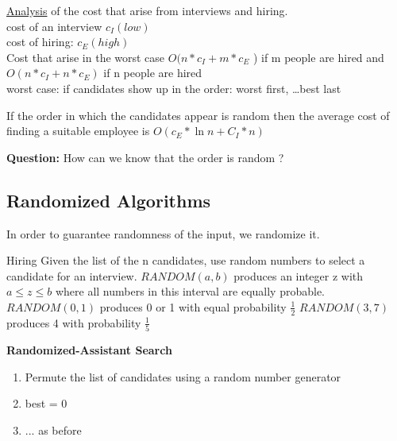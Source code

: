 \underline{Analysis} of the cost that arise from interviews and hiring.\\
cost of an interview $c{_I}(low)$\\
cost of hiring: $c{_E}(high)$\\
Cost that arise in the worst case $O(n* c{_I} +  m * c{_E}$ ) if m people are hired 
and \\
$O(n * c{_I} +  n *  c{_E} )$ if n people are hired \\
worst case: if candidates show up in the order: worst first, \ldots best last



\begin{lemma}
If the order in which the candidates appear is random then the average cost of finding a suitable employee is
$ O( c_E *  \ln n + C_I * n)$
\end{lemma}

\textbf{Question:}
How can we know that the order is random ?\\

\subsection{Randomized Algorithms}
In order to guarantee randomness of the input, we randomize it. 

\begin{example}{Hiring}
Given the list of the n candidates, use random numbers to select a candidate for an interview.
$RANDOM(a,b)$ produces an integer z with  $a \leq z \leq b$ where all numbers in this interval are equally probable. 
$RANDOM(0,1)$ produces 0 or 1 with equal probability $\frac{1}{2}$
$RANDOM(3,7)$ produces 4 with probability $\frac{1}{5}$ \\
\end{example}
  
\textbf{Randomized-Assistant Search}
\begin{enumerate}[label={\arabic*.}]
 \item Permute the list of candidates using a  random number generator
 \item best = 0
 \item ... as before
\end{enumerate}

